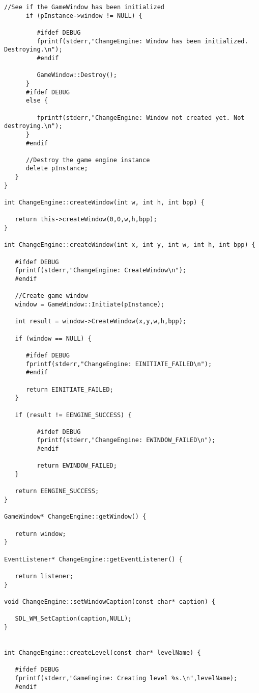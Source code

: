 \documentclass[12pt]{article}
\begin{document}
\begin{lstlisting}[breaklines]
      //See if the GameWindow has been initialized
      if (pInstance->window != NULL) {
         
         #ifdef DEBUG
         fprintf(stderr,"ChangeEngine: Window has been initialized. Destroying.\n");
         #endif
         
         GameWindow::Destroy();
      }
      #ifdef DEBUG
      else {
         
         fprintf(stderr,"ChangeEngine: Window not created yet. Not destroying.\n");
      }
      #endif

      //Destroy the game engine instance
      delete pInstance;
   }
}

int ChangeEngine::createWindow(int w, int h, int bpp) {
   
   return this->createWindow(0,0,w,h,bpp);
}

int ChangeEngine::createWindow(int x, int y, int w, int h, int bpp) {

   #ifdef DEBUG
   fprintf(stderr,"ChangeEngine: CreateWindow\n");
   #endif
   
   //Create game window
   window = GameWindow::Initiate(pInstance);

   int result = window->CreateWindow(x,y,w,h,bpp);

   if (window == NULL) {

      #ifdef DEBUG
      fprintf(stderr,"ChangeEngine: EINITIATE_FAILED\n");
      #endif
      
      return EINITIATE_FAILED;
   }

   if (result != EENGINE_SUCCESS) {

         #ifdef DEBUG
         fprintf(stderr,"ChangeEngine: EWINDOW_FAILED\n");
         #endif
   
         return EWINDOW_FAILED;
   }

   return EENGINE_SUCCESS;
}

GameWindow* ChangeEngine::getWindow() {

   return window;
}

EventListener* ChangeEngine::getEventListener() {

   return listener;
}

void ChangeEngine::setWindowCaption(const char* caption) {

   SDL_WM_SetCaption(caption,NULL);
}


int ChangeEngine::createLevel(const char* levelName) {
   
   #ifdef DEBUG
   fprintf(stderr,"GameEngine: Creating level %s.\n",levelName);
   #endif
   

\end{lstlisting}
\end{document}
